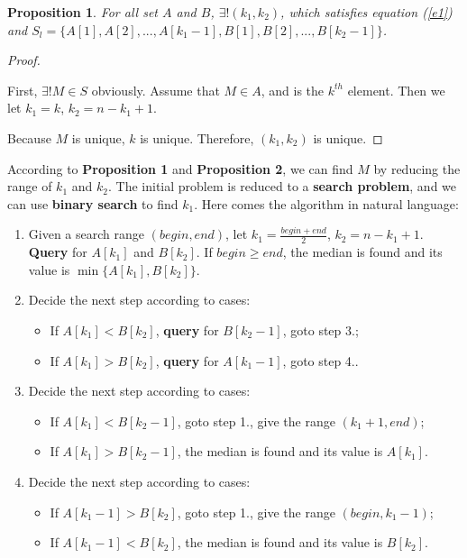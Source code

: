 \documentclass{article}
\newtheorem{pro}{Proposition}
\begin{document}
    \begin{pro}
        For all set $A$ and $B$,  $\exists !(k_{1}, k_{2})$, which satisfies equation (\ref{e1}) and $S_{l} = \{A[1], A[2], ..., A[k_{1} - 1], B[1], B[2], ..., B[k_{2} - 1]\}$.
    \end{pro}

    \begin{proof}
        \

        First, $\exists ! M\in S$ obviously. Assume that $M\in A$, and is the $k^{th}$ element. Then we let $k_{1} = k$, $k_{2} = n - k_{1} + 1$.

        Because $M$ is unique, $k$ is unique. Therefore, $(k_{1}, k_{2})$ is unique.
    \end{proof}

    According to \textbf{Proposition 1} and \textbf{Proposition 2}, we can find $M$ by reducing the range of $k_{1}$ and $k_{2}$. The initial problem is reduced to a \textbf{search problem}, and we can use \textbf{binary search} to find $k_{1}$. Here comes the algorithm in natural language:

    \begin{enumerate}
        \item Given a search range $(begin, end)$, let $\displaystyle k_{1} = \frac{begin + end}{2}$, $k_{2} = n - k_{1} + 1$. \textbf{Query} for $A[k_{1}]$ and $B[k_{2}]$. If $begin \ge end$, the median is found and its value is $\min\{A[k_{1}], B[k_{2}]\}$.
        \item Decide the next step according to cases:
        \begin{itemize}
            \item If $A[k_{1}] < B[k_{2}]$, \textbf{query} for $B[k_{2} - 1]$, goto step 3.;
            \item If $A[k_{1}] > B[k_{2}]$, \textbf{query} for $A[k_{1} - 1]$, goto step 4..
        \end{itemize}
        \item Decide the next step according to cases:
        \begin{itemize}
            \item If $A[k_{1}] < B[k_{2} - 1]$, goto step 1., give the range $(k_{1} + 1, end)$;
            \item If $A[k_{1}] > B[k_{2} - 1]$, the median is found and its value is $A[k_{1}]$.
        \end{itemize}
        \item Decide the next step according to cases:
        \begin{itemize}
            \item If $A[k_{1} - 1] > B[k_{2}]$, goto step 1., give the range $(begin, k_{1} - 1)$;
            \item If $A[k_{1} - 1] < B[k_{2}]$, the median is found and its value is $B[k_{2}]$.
        \end{itemize}
    \end{enumerate}
\end{document}
